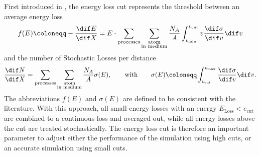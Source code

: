 First introduced in \cite{Lipari91}, the energy loss cut represents the threshold between an average energy loss
\begin{align} \label{eq:cuts_dedx}
    f(E) \coloneqq -\frac{\dif E}{\dif X} = 
        E \cdot \sum_\text{processes} \sum_{\substack{\text{atom} \\ \text{in medium}}}
        \frac{N_A}{A} \int_{v_{\min}}^{v_{\textrm{cut}}} v \frac{\dif \sigma}{\dif v} \dif v
\end{align}
and the number of Stochastic Losses per distance
\begin{align} \label{eq:cuts_dndx}
    \frac{\dif N}{\dif X} = 
        \sum_\text{processes} \sum_{\substack{\text{atom} \\ \text{in medium}}}
        \frac{N_A}{A} \sigma(E) ,
    \qquad \text{with} \qquad
    \sigma(E) \coloneqq \int_{v_{\text{cut}}}^{v_{\max}} \frac{\dif \sigma}{\dif v} \dif v .
\end{align}
The abbreviations $f(E)$ and $\sigma(E)$ are defined to be consistent with the literature.
With this approach, all small energy losses with an energy $E_{\text{Loss}} < e_{\text{cut}}$ are combined to a continuous loss and averaged out, while all energy losses above the cut are treated stochastically.
The energy loss cut is therefore an important parameter to adjust either the performance of the simulation using high cuts, or an accurate simulation using small cuts.
